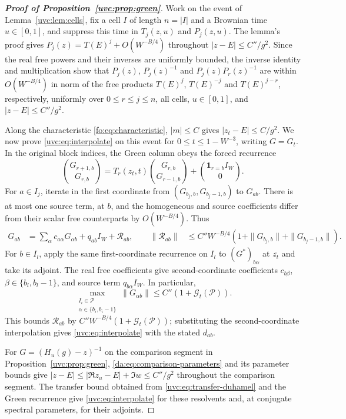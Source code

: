 \documentclass[11pt]{article}
\numberwithin{equation}{section}
\theoremstyle{remark}
\newcommand{\one}{\mathbf 1}
\begin{document}
\begin{proof}[\textbf{Proof of Proposition~\ref{uvc:prop:green}}]
Work on the event of Lemma~\ref{uvc:lem:cells}, fix a cell $I$ of length
$n=|I|$ and a Brownian time $u\in[0,1]$, and suppress this time in
$T_j(z,u)$ and $P_j(z,u)$. The lemma's proof gives
$P_j(z)=T(E)^j+O(W^{-B/4})$ throughout $|z-E|\le C''/g^2$.
Since the real free powers and their inverses are uniformly bounded,
the inverse identity and multiplication show that
$P_j(z)$, $P_j(z)^{-1}$ and $P_j(z)P_r(z)^{-1}$ are within
$O(W^{-B/4})$ in norm of the free products
$T(E)^j$, $T(E)^{-j}$ and $T(E)^{j-r}$, respectively, uniformly over
$0\le r\le j\le n$, all cells, $u\in[0,1]$, and $|z-E|\le C''/g^2$.

Along the characteristic \eqref{fo:eq:characteristic}, $|m|\le C$ gives
$|z_t-E|\le C/g^2$. We now prove \eqref{uvc:eq:interpolate} on this
event for $0\le t\le1-W^{-3}$, writing $G=G_t$.
In the original block indices, the Green column obeys the forced recurrence
\[
 \binom{G_{r+1,b}}{G_{r,b}}
 =T_r(z_t,t)\binom{G_{r,b}}{G_{r-1,b}}
                 +\binom{\one_{r=b}I_W}{0}.
\]
For $a\in I_j$, iterate in the first coordinate from
$(G_{b_j,b},G_{b_j-1,b})$ to $G_{ab}$.
There is at most one source term, at $b$, and the homogeneous
and source coefficients differ from their scalar free counterparts
by $O(W^{-B/4})$.
Thus
\[
 \begin{aligned}
 G_{ab}&=\sum_\alpha c_{a\alpha}G_{\alpha b}
                  +q_{ab}I_W+\mathcal R_{ab},\qquad
 \|\mathcal R_{ab}\|&\le C''W^{-B/4}
       (1+\|G_{b_j,b}\|+\|G_{b_j-1,b}\|).
 \end{aligned}
\]
For $b\in I_l$, apply the same first-coordinate recurrence on $I_l$ to
$(G^*)_{b\alpha}$ at $\overline{z_t}$ and take its adjoint. The real free coefficients
give second-coordinate coefficients $c_{b\beta}$,
$\beta\in\{b_l,b_l-1\}$, and source term $q_{b\alpha}I_W$. In particular,
\[
 \max_{\substack{I_i\in\mathcal P\\\alpha\in\{b_i,b_i-1\}}}
 \|G_{\alpha b}\|\le C''(1+\mathcal G_t(\mathcal P)).
\]
This bounds $\mathcal R_{ab}$ by $C''W^{-B/4}(1+\mathcal G_t(\mathcal P))$;
substituting the second-coordinate interpolation gives
\eqref{uvc:eq:interpolate} with the stated $d_{ab}$.

For $G=(H_u(g)-z)^{-1}$ on the comparison segment in
Proposition~\ref{uvc:prop:green}, \eqref{da:eq:comparison-parameters}
and its parameter bounds give
$|z-E|\le|\Re z_u-E|+\Im w\le C''/g^2$ throughout the comparison segment.
The transfer bound obtained from \eqref{uvc:eq:transfer-duhamel} and
the Green recurrence give \eqref{uvc:eq:interpolate} for these resolvents
and, at conjugate spectral parameters, for their adjoints.


\end{proof}
\end{document}
